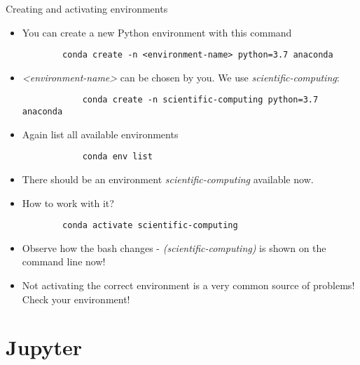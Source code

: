 \begin{frame}[fragile]{Creating and activating environments}

	\begin{itemize}
		\item You can create a new Python environment with this command
		\begin{verbatim}
		conda create -n <environment-name> python=3.7 anaconda
		\end{verbatim}

		\item \textit{<environment-name>} can be chosen by you. We use \textit{scientific-computing}:
		\begin{verbatim}
			conda create -n scientific-computing python=3.7 anaconda

		\end{verbatim}

		\item Again list all available environments
			\begin{verbatim}
			conda env list
			\end{verbatim}
		\item There should be an environment \textit{scientific-computing} available now.
		\item How to work with it?
		\begin{verbatim}
		conda activate scientific-computing
		\end{verbatim}
		\item Observe how the bash changes - \textit{(scientific-computing)} is shown on the command line now!
		\item Not activating the correct environment is a very common source of problems! Check your environment!

	\end{itemize}

\end{frame}


\section{Jupyter}

